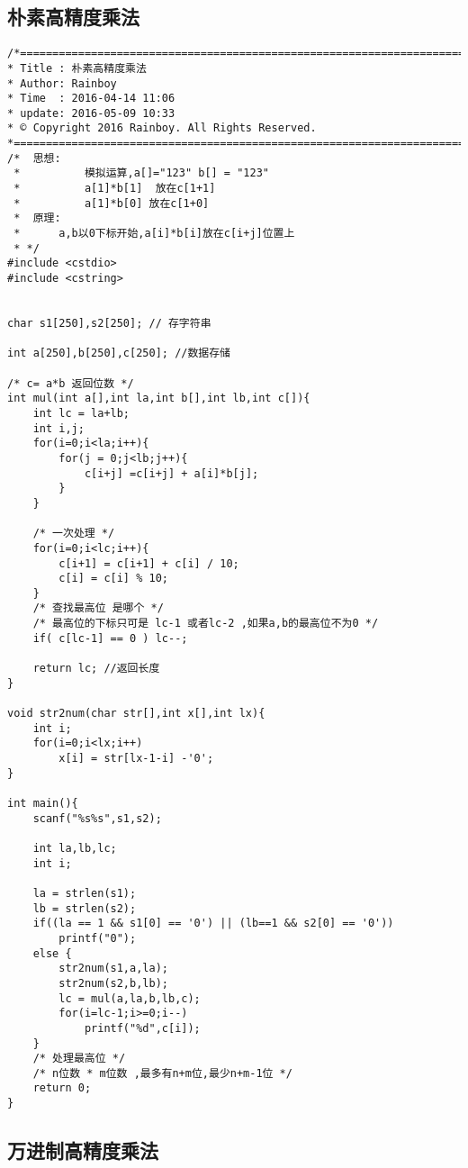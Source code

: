 \subsection{朴素高精度乘法}

\begin{lstlisting}
/*============================================================================
* Title : 朴素高精度乘法
* Author: Rainboy
* Time  : 2016-04-14 11:06
* update: 2016-05-09 10:33
* © Copyright 2016 Rainboy. All Rights Reserved.
*=============================================================================*/
/*  思想:
 *          模拟运算,a[]="123" b[] = "123"
 *          a[1]*b[1]  放在c[1+1]
 *          a[1]*b[0] 放在c[1+0]
 *  原理:
 *      a,b以0下标开始,a[i]*b[i]放在c[i+j]位置上
 * */
#include <cstdio>
#include <cstring>


char s1[250],s2[250]; // 存字符串

int a[250],b[250],c[250]; //数据存储

/* c= a*b 返回位数 */
int mul(int a[],int la,int b[],int lb,int c[]){
    int lc = la+lb;
    int i,j;
    for(i=0;i<la;i++){
        for(j = 0;j<lb;j++){
            c[i+j] =c[i+j] + a[i]*b[j];
        }
    }

    /* 一次处理 */
    for(i=0;i<lc;i++){
        c[i+1] = c[i+1] + c[i] / 10;
        c[i] = c[i] % 10;
    }
    /* 查找最高位 是哪个 */
    /* 最高位的下标只可是 lc-1 或者lc-2 ,如果a,b的最高位不为0 */
    if( c[lc-1] == 0 ) lc--;

    return lc; //返回长度
}

void str2num(char str[],int x[],int lx){
    int i;
    for(i=0;i<lx;i++)
        x[i] = str[lx-1-i] -'0';
}

int main(){
    scanf("%s%s",s1,s2);

    int la,lb,lc;
    int i;

    la = strlen(s1);
    lb = strlen(s2);
    if((la == 1 && s1[0] == '0') || (lb==1 && s2[0] == '0'))
        printf("0");
    else {
        str2num(s1,a,la);
        str2num(s2,b,lb);
        lc = mul(a,la,b,lb,c);
        for(i=lc-1;i>=0;i--)
            printf("%d",c[i]);
    }
    /* 处理最高位 */
    /* n位数 * m位数 ,最多有n+m位,最少n+m-1位 */
    return 0;
}
\end{lstlisting}

\subsection{万进制高精度乘法}

